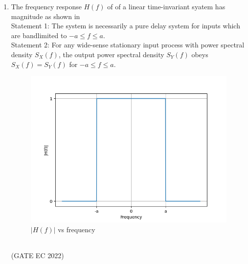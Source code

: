 \begin{enumerate}[label=\thechapter.\arabic*,ref=\thechapter.\theenumi]
\item The frequency response $H(f)$ of of a linear time-invariant syatem has magnitude as shown in \\
Statement 1: The system is necessarily a pure delay system for inputs which are bandlimited to $-a \leq f \leq a$.\\
Statement 2: For any wide-sense stationary input process with power spectral density $S_X(f)$, the output power spectral density $S_Y(f)$ obeys $S_X(f)=S_Y(f)$ for $-a \leq f \leq a$.\\
\begin{figure}[!ht]
\centering
\includegraphics[width=\columnwidth]{gate/EC/2022/23/figs/figure.png}
\caption{$|H(f)|$ vs frequency}
\end{figure}
\label{fig:23,2022}\\

\hfill (GATE EC 2022)
\end{enumerate}
